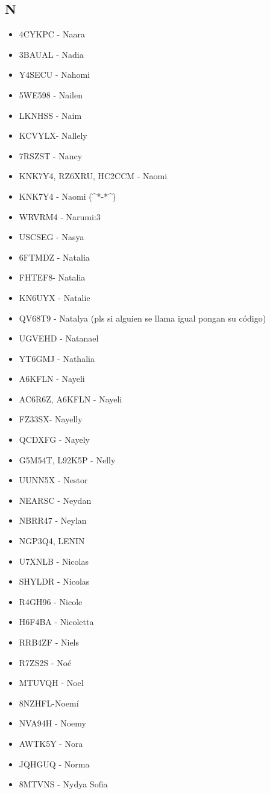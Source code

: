\subsection*{N}
\begin{itemize}[leftmargin=*,nosep]
\item 4CYKPC - Naara
\item 3BAUAL  -  Nadia
\item Y4SECU - Nahomi
\item 5WE598 - Nailen
\item LKNHSS - Naim
\item KCVYLX- Nallely
\item 7RSZST - Nancy
\item KNK7Y4, RZ6XRU, HC2CCM - Naomi
\item KNK7Y4 - Naomi (\textasciicircum{}*-*\textasciicircum{})
\item WRVRM4 - Narumi:3
\item USCSEG - Nasya
\item 6FTMDZ - Natalia
\item FHTEF8- Natalia
\item KN6UYX - Natalie
\item QV68T9 - Natalya (pls si alguien se llama igual pongan su código)
\item UGVEHD - Natanael
\item YT6GMJ - Nathalia
\item A6KFLN - Nayeli
\item AC6R6Z, A6KFLN - Nayeli
\item FZ33SX- Nayelly
\item QCDXFG - Nayely
\item G5M54T, L92K5P - Nelly
\item UUNN5X - Nestor
\item NEARSC - Neydan
\item NBRR47 - Neylan
\item NGP3Q4, LENIN
\item U7XNLB - Nicolas
\item SHYLDR - Nicolas
\item R4GH96 - Nicole
\item H6F4BA - Nicoletta
\item RRB4ZF - Niels
\item R7ZS2S - Noé
\item MTUVQH - Noel
\item 8NZHFL-Noemí
\item NVA94H - Noemy
\item AWTK5Y - Nora
\item JQHGUQ - Norma
\item 8MTVNS - Nydya Sofia
\end{itemize}


